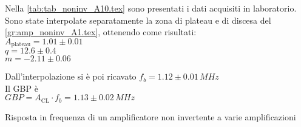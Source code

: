 Nella \autoref{tab:tab_noninv_A10.tex} sono presentati i dati acquisiti in laboratorio.
%   
Sono state interpolate separatamente la zona di plateau e di discesa del  \autoref{gr:amp_noninv_A1.tex}, ottenendo come risultati:\\
$A_\textrm{plateau}=1.01 \pm 0.01$\\
$q = 12.6 \pm 0.4$\\
$m  = -2.11 \pm 0.06$

Dall'interpolazione si è poi ricavato 
$f_b=1.12\pm 0.01 \,MHz $\\
Il GBP è\\
$GBP=A_\textrm{CL} \cdot f_b  = 1.13 \pm 0.02 \,MHz$




\begin{grafico}
 \centering 
  \resizebox{\textwidth}{!}{%
  
 }%
 \caption{Risposta in frequenza di un amplificatore non invertente a varie amplificazioni} 
 \label{gr:amp_noninv_all.tex} 
\end{grafico}


